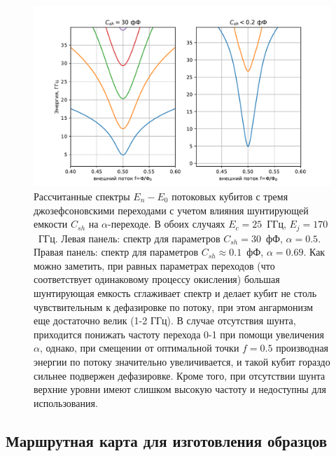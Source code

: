 \begin{figure}[htb]\center
	\includegraphics[width=1\textwidth]{images/3jj_spectra.pdf} \hfill
	\caption[Влияение шунтирующей емкости на спектры потоковых кубитов]{Рассчитанные спектры $E_n-E_0$ потоковых кубитов с тремя джозефсоновскими переходами с учетом влияния шунтирующей емкости $C_{sh}$ на $\alpha$-переходе. В обоих случаях $E_c = 25$~ГГц, $E_j=170$~ГГц. Левая панель: спектр для параметров $C_{sh} = 30$~фФ, $\alpha=0.5$. Правая панель: спектр для параметров $C_{sh} \approx 0.1$~фФ, $\alpha=0.69$. Как можно заметить, при равных параметрах переходов (что соответствует одинаковому процессу окисления) большая шунтирующая емкость сглаживает спектр и делает кубит не столь чувствительным к дефазировке по потоку, при этом ангармонизм еще достаточно велик (1-2 ГГц). В случае отсутствия шунта, приходится понижать частоту перехода 0-1 при помощи увеличения $\alpha$, однако, при смещении от оптимальной точки $f=0.5$ производная энергии по потоку значительно увеличивается, и такой кубит гораздо сильнее подвержен дефазировке. Кроме того, при отсутствии шунта верхние уровни имеют слишком высокую частоту и недоступны для использования.}
	\label{fig: 3jj_spectra}
\end{figure}
\subsection{Маршрутная карта для изготовления образцов}

